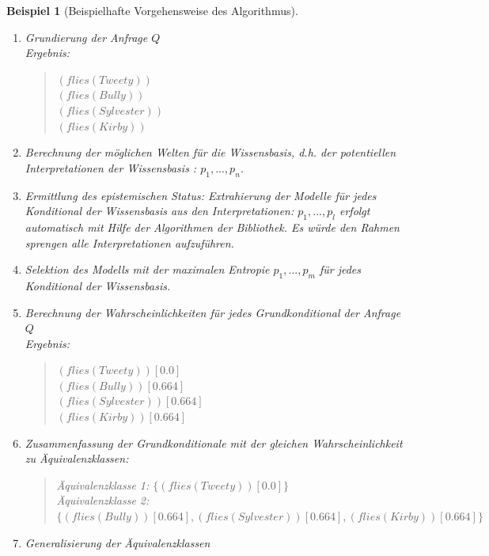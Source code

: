 \documentclass[a4paper, 11pt]{book}
\newtheorem{Bsp}{Beispiel}[section]
\begin{document}
{\begin{Bsp}[Beispielhafte Vorgehensweise des Algorithmus]
\begin{enumerate}
		\item Grundierung der Anfrage $ Q $\\
		Ergebnis:
		\begin{quote}
			$ (flies(Tweety))$\\
			$ (flies(Bully))$\\
			$ (flies(Sylvester))$\\
			$ (flies(Kirby))$\\
		\end{quote}
		\item Berechnung der möglichen Welten für die Wissensbasis, d.h. der potentiellen Interpretationen der Wissensbasis : $ p_1, ..., p_n $.
		\item Ermittlung des epistemischen Status: Extrahierung der Modelle für jedes Konditional der Wissensbasis aus den Interpretationen: $ p_1, ..., p_l $ erfolgt automatisch mit Hilfe der Algorithmen der Bibliothek. Es würde den Rahmen sprengen alle Interpretationen aufzuführen.\\
		\item Selektion des Modells mit der maximalen Entropie $p_1, ..., p_m$ für jedes Konditional der Wissensbasis.
		\item Berechnung der Wahrscheinlichkeiten für jedes Grundkonditional der Anfrage $ Q $\\
		Ergebnis:
		\begin{quote}
			$(flies(Tweety))[0.0]$\\
			$(flies(Bully))[0.664]$\\
			$(flies(Sylvester))[0.664]$\\
			$(flies(Kirby))[0.664]$
		\end{quote}
		\item Zusammenfassung der Grundkonditionale mit der gleichen Wahrscheinlichkeit zu Äquivalenzklassen:
		
		\begin{quote}
			Äquivalenzklasse 1: $\{(flies(Tweety))[0.0]\}$\\
			Äquivalenzklasse 2: $\{(flies(Bully))[0.664], (flies(Sylvester))[0.664], (flies(Kirby))[0.664]\}$
		\end{quote}
		
		\item Generalisierung der Äquivalenzklassen
		\begin{quote}
			

\end{quote}
\end{enumerate}
\end{Bsp}}
\end{document}

